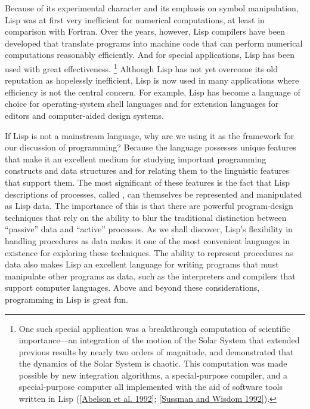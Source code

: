 Because of its experimental character and its emphasis on symbol manipulation, Lisp was at first very inefficient for numerical computations, at least in comparison with Fortran.
Over the years, however, Lisp compilers have been developed that translate programs into machine code that can perform numerical computations reasonably efficiently.
And for special applications, Lisp has been used with great effectiveness.%
\footnote{
	One such special application was a breakthrough computation of scientific importance---an integration of the motion of the Solar System that extended previous results by nearly two orders of magnitude, and demonstrated that the dynamics of the Solar System is chaotic.
	This computation was made possible by new integration algorithms, a special-purpose compiler, and a special-purpose computer all implemented with the aid of software tools written in Lisp (\cref{Abelson et al. 1992}; \cref{Sussman and Wisdom 1992}).
}
Although Lisp has not yet overcome its old reputation as hopelessly inefficient, Lisp is now used in many applications where efficiency is not the central concern.
For example, Lisp has become a language of choice for operating-system shell languages and for extension languages for editors and computer-aided design systems.

If Lisp is not a mainstream language, why are we using it as the framework for our discussion of programming?
Because the language possesses unique features that make it an excellent medium for studying important programming constructs and data structures and for relating them to the linguistic features that support them.
The most significant of these features is the fact that Lisp descriptions of processes, called , can themselves be represented and manipulated as Lisp data.
The importance of this is that there are powerful program-design techniques that rely on the ability to blur the traditional distinction between “passive” data and “active” processes.
As we shall discover, Lisp’s flexibility in handling procedures as data makes it one of the most convenient languages in existence for exploring these techniques.
The ability to represent procedures as data also makes Lisp an excellent language for writing programs that must manipulate other programs as data, such as the interpreters and compilers that support computer languages.
Above and beyond these considerations, programming in Lisp is great fun.




